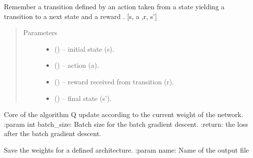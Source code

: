 \documentclass[letterpaper,10pt,english]{sphinxmanual}
\begin{document}
\begin{fulllineitems}
\begin{fulllineitems}
\label{\detokenize{package2:dqn.DQNAgent.remember}}
Remember a transition defined by an action  taken from a state  yielding a transition to a next
state  and a reward . {[}s, a ,r, s'{]}
\begin{quote}\begin{description}
\item[{Parameters}] \leavevmode\begin{itemize}
\item {} 
 () -- initial state (s).

\item {} 
 () -- action (a).

\item {} 
 () -- reward received from transition (r).

\item {} 
 () -- final state (s').

\end{itemize}

\end{description}\end{quote}

\end{fulllineitems}


\begin{fulllineitems}
\label{\detokenize{package2:dqn.DQNAgent.replay}}
Core of the algorithm Q update according to the current weight of the network.
:param int batch\_size: Batch size for the batch gradient descent.
:return: the loss after the batch gradient descent.

\end{fulllineitems}


\begin{fulllineitems}
\label{\detokenize{package2:dqn.DQNAgent.save}}
Save the weights for a defined architecture.
:param name: Name of the output file


\end{fulllineitems}
\end{fulllineitems}
\end{document}
